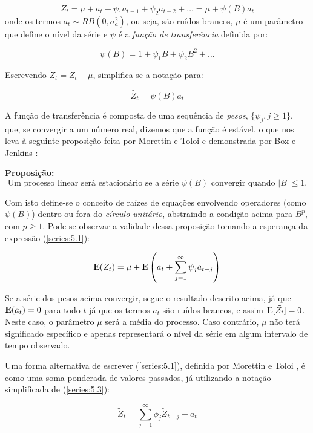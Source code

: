\begin{equation}\label{series:5.1}
Z_t = \mu + a_t + \psi_1 a_{t-1} + \psi_2 a_{t-2} + \ldots = \mu + \psi(B)a_t
\end{equation}
onde os termos $a_t \sim RB(0, \sigma_a^2)$, ou seja, são ruídos brancos, $\mu$ é um parâmetro que define o nível da série e $\psi$ é a \emph{função de transferência} definida por:

\[ \psi(B) = 1 + \psi_1 B + \psi_2 B^2 + \ldots \]

Escrevendo $\tilde{Z_t} = Z_t - \mu$, simplifica-se a notação para:

\begin{equation}\label{series:5.3}
\tilde{Z_t} =  \psi(B)a_t 
\end{equation}

A função de transferência é composta de uma sequência de \emph{pesos}, $\{ \psi_j, j \geq 1 \}$, que, se convergir a um número real, dizemos que a função é estável, o que nos leva à seguinte proposição feita por Morettin e Toloi \citep{morettin} e demonstrada por Box e Jenkins \citep{box}:

\textbf{Proposição:}
\begin{equation}\label{prop:5.1}
\text{Um processo linear será estacionário se a série } \psi(B) \text{ convergir quando } |B| \leq 1.
\end{equation}

Com isto define-se o conceito de raízes de equações envolvendo operadores (como $\psi(B)$) dentro ou fora do \emph{círculo unitário}, abstraindo a condição acima para $B^p$, com $p \geq 1$. Pode-se observar a validade dessa proposição tomando a esperança da expressão (\ref{series:5.1}):

\[
{\rm I\kern-.3em E}(Z_t) = \mu + {\rm I\kern-.3em E} \left( a_t + \sum_{j=1}^\infty \psi_j a_{t-j} \right)
\]

Se a série dos pesos acima convergir, segue o resultado descrito acima, já que ${\rm I\kern-.3em E}(a_t) = 0$ para todo $t$ já que os termos $a_t$ são ruídos brancos, e assim ${\rm I\kern-.3em E}[\tilde{Z_t}] = 0$. Neste caso, o parâmetro $\mu$ será a média do processo. Caso contrário, $\mu$ não terá significado específico e apenas representará o nível da série em algum intervalo de tempo observado.

Uma forma alternativa de escrever (\ref{series:5.1}), definida por Morettin e Toloi \citep{morettin}, é como uma soma ponderada de valores passados, já utilizando a notação simplificada de (\ref{series:5.3}):

\begin{equation}\label{series:5.6}
\tilde{Z}_t = \sum_{j=1}^\infty \phi_j \tilde{Z}_{t-j} + a_t
\end{equation}

